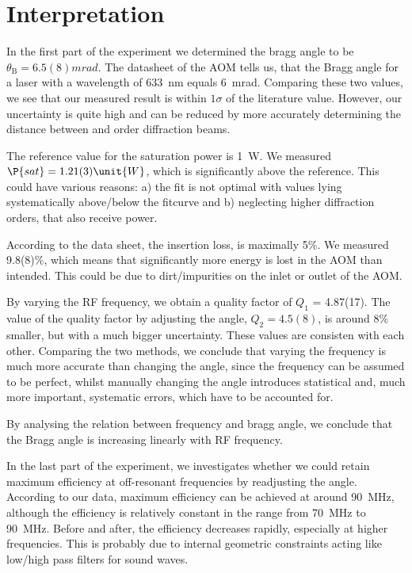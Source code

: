 \section{Interpretation}
In the first part of the experiment we determined the bragg angle to be $\theta_{\mathrm{B}} = 6.5(8) \unit{mrad}$. The datasheet of the AOM \autocite{AOM} tells us, that the Bragg angle for a laser with a wavelength of \SI{633}{nm} equals \SI{6}{mrad}. Comparing these two values, we see that our measured result is within $1\sigma$ of the literature value. However, our uncertainty is quite high and can be reduced by more accurately determining the distance between  and  order diffraction beams. 

The reference value for the saturation power is \SI{1}{W}. We measured $\P{sat} = 1.21(3) \unit{W}$, which is significantly above the reference. This could have various reasons: a) the fit is not optimal with values lying systematically above/below the fitcurve and b) neglecting higher diffraction orders, that also receive power. 

According to the data sheet, the insertion loss, is maximally 5\:\%. We measured 9.8(8)\:\%, which means that significantly more energy is lost in the AOM than intended. This could be due to dirt/impurities on the inlet or outlet of the AOM. 

By varying the RF frequency, we obtain a quality factor of $Q_1$ = 4.87(17). The value of the quality factor by adjusting the angle, $Q_2 = 4.5(8)$, is around 8\:\% smaller, but with a much bigger uncertainty. These values are consisten with each other. Comparing the two methods, we conclude that varying the frequency is much more accurate than changing the angle, since the frequency can be assumed to be perfect, whilst manually changing the angle introduces statistical and, much more important, systematic errors, which have to be accounted for.

By analysing the relation between frequency and bragg angle, we conclude that the Bragg angle is increasing linearly with RF frequency. 

In the last part of the experiment, we investigates whether we could retain maximum efficiency at off-resonant frequencies by readjusting the angle. According to our data, maximum efficiency can be achieved at around \SI{90}{MHz}, although the efficiency is relatively constant in the range from \SI{70}{MHz} to \SI{90}{MHz}. Before and after, the efficiency decreases rapidly, especially at higher frequencies. This is probably due to internal geometric constraints acting like low/high pass filters for sound waves.